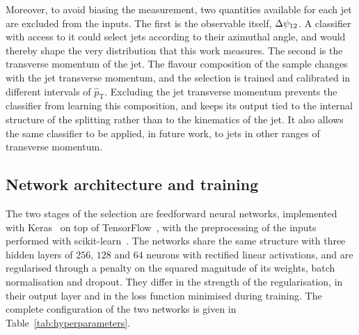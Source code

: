 Moreover, to avoid biasing the measurement, two quantities available for each jet
are excluded from the inputs. The first is the observable itself, $\Delta\psi_{12}$. A
classifier with access to it could select jets according to their azimuthal angle,
and would thereby shape the very distribution that this work measures. The second
is the transverse momentum of the jet. The flavour composition of the sample
changes with the jet transverse momentum, and the selection is trained and
calibrated in different intervals of $\hat{p}_{\mathrm{T}}$. Excluding the jet
transverse momentum prevents the classifier from learning this composition, and
keeps its output tied to the internal structure of the splitting rather than to
the kinematics of the jet. It also allows the same classifier to be applied, in
future work, to jets in other ranges of transverse momentum.

\subsection{Network architecture and training}
\label{sec:flavour-training}

The two stages of the selection are feedforward neural networks, implemented with Keras~\cite{Chollet:2015keras} on top of
TensorFlow~\cite{Abadi:2016tf}, with the preprocessing of the inputs performed
with scikit-learn~\cite{Pedregosa:2011sklearn}. The networks share the same structure 
with three hidden layers of $256$, $128$ and $64$ neurons with
rectified linear activations, and are regularised through a penalty on the squared
magnitude of its weights, batch normalisation and dropout. They differ in
the strength of the regularisation, in their output layer and in the loss function
minimised during training. The complete configuration of the two networks is
given in Table~\ref{tab:hyperparameters}.

